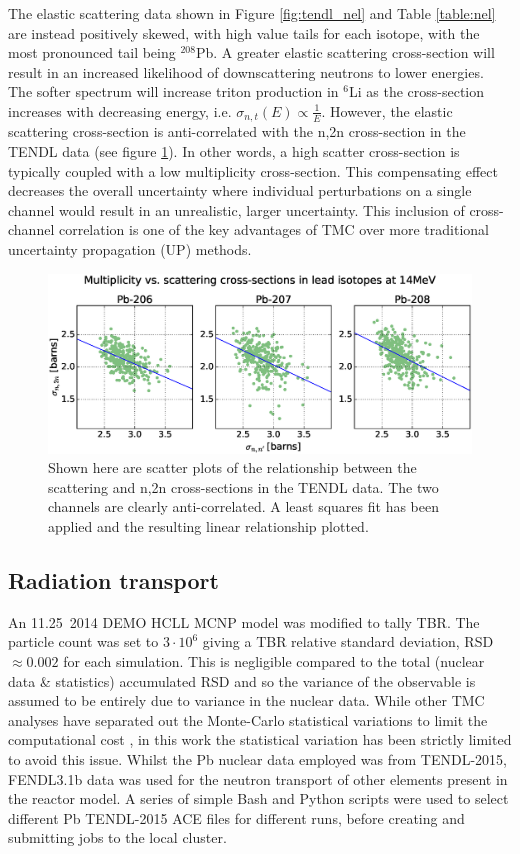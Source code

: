 The elastic scattering data shown in Figure \ref{fig:tendl_nel} and Table \ref{table:nel} are instead positively skewed, with high value tails for each isotope, with the most pronounced tail being $^{208}$Pb. A greater elastic scattering cross-section will result in an increased likelihood of downscattering neutrons to lower energies. The softer spectrum will increase triton production in $^{6}$Li as the cross-section increases with decreasing energy, i.e. $\sigma_{n,t}(E) \propto \frac{1}{E}$. However, the elastic scattering cross-section is anti-correlated with the n,2n cross-section in the TENDL data (see figure \ref{fig:pb_el_n2n_corr}). In other words, a high scatter cross-section is typically coupled with a low multiplicity cross-section. This compensating effect decreases the overall uncertainty where individual perturbations on a single channel would result in an unrealistic, larger uncertainty. This inclusion of cross-channel correlation is one of the key advantages of TMC over more traditional uncertainty propagation (UP) methods. 

\begin{figure}[ht]
	\includegraphics[width=\textwidth]{pb_el_n2n_corr}
  \caption{Shown here are scatter plots of the relationship between the scattering and n,2n cross-sections in the TENDL data. The two channels are clearly anti-correlated. A least squares fit has been applied and the resulting linear relationship plotted.}
	\label{fig:pb_el_n2n_corr}
\end{figure}

\FloatBarrier
\subsection{Radiation transport}
An 11.25\degree \ 2014 DEMO HCLL MCNP model was modified to tally TBR. The particle count was set to $3\cdot10^{6}$ giving a TBR relative standard deviation, RSD $\approx 0.002$ for each simulation. This is negligible compared to the total (nuclear data \& statistics) accumulated RSD and so the variance of the observable is assumed to be entirely due to variance in the nuclear data. While other TMC analyses have separated out the Monte-Carlo statistical variations to limit the computational cost \cite{Rochman2014a}, in this work the statistical variation has been strictly limited to avoid this issue. Whilst the Pb nuclear data employed was from TENDL-2015, FENDL3.1b data was used for the neutron transport of other elements present in the reactor model. A series of simple Bash and Python scripts were used to select different Pb TENDL-2015 ACE files for different runs, before creating and submitting jobs to the local cluster.

